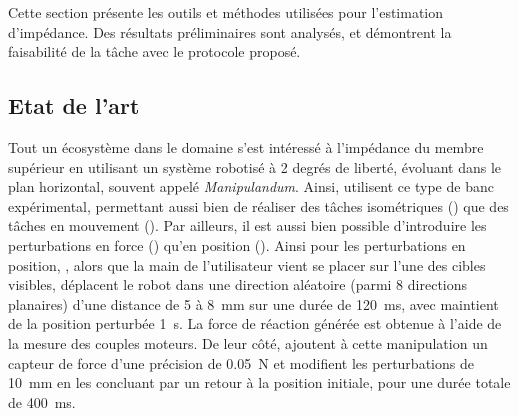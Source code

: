 \documentclass[12pt, a4paper]{article} %
\numberwithin{equation}{section}
\begin{document}
Cette section présente les outils et méthodes utilisées pour l'estimation d'impédance. Des résultats préliminaires sont analysés, et démontrent la faisabilité de la tâche avec le protocole proposé.

\subsection{Etat de l'art} \label{sec_impedance_estimation_sub_litterature}

Tout un écosystème dans le domaine s'est intéressé à l'impédance du membre supérieur en utilisant un système robotisé à 2 degrés de liberté, évoluant dans le plan horizontal, souvent appelé \textit{Manipulandum}. Ainsi, \cite{mussa-ivaldi_neural_1985,dolan_dynamic_1993, tsuji_human_1995,gomi_human_1997,burdet_method_2000} utilisent ce type de banc expérimental, permettant aussi bien de réaliser des tâches isométriques (\cite{mussa-ivaldi_neural_1985,dolan_dynamic_1993,tsuji_human_1995,gomi_human_1997}) que des tâches en mouvement (\cite{gomi_human_1997,burdet_method_2000}). Par ailleurs, il est aussi bien possible d'introduire les perturbations en force (\cite{dolan_dynamic_1993,gomi_human_1997}) qu'en position (\cite{mussa-ivaldi_neural_1985,tsuji_human_1995,gomi_human_1997,burdet_method_2000}).
%
\newlineBlank
%
%
Ainsi pour les perturbations en position, \cite{mussa-ivaldi_neural_1985}, alors que la main de l'utilisateur vient se placer sur l'une des cibles visibles, déplacent le robot dans une direction aléatoire (parmi 8 directions planaires) d'une distance de \SI{5}{} à \SI{8}{\milli\metre} sur une durée de \SI{120}{\milli\second}, avec maintient de la position perturbée \SI{1}{\second}. La force de réaction générée est obtenue à l'aide de la mesure des couples moteurs. De leur côté, \cite{tsuji_human_1995} ajoutent à cette manipulation un capteur de force d'une précision de \SI{0.05}{\newton} et modifient les perturbations de \SI{10}{\milli\metre} en les concluant par un retour à la position initiale, pour une durée totale de \SI{400}{\milli\second}. %
\end{document}
